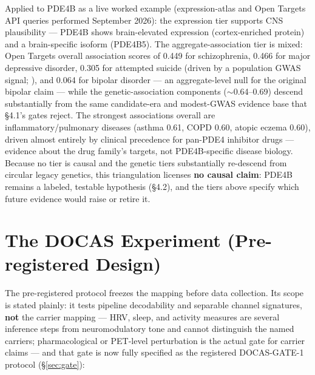 \documentclass[11pt,twocolumn]{article}
\theoremstyle{plain}
\begin{document}
Applied to PDE4B as a live worked example (expression-atlas and Open Targets API queries performed September 2026): the expression tier supports CNS plausibility --- PDE4B shows brain-elevated expression (cortex-enriched protein) and a brain-specific isoform (PDE4B5). The aggregate-association tier is mixed: Open Targets overall association scores of 0.449 for schizophrenia, 0.466 for major depressive disorder, 0.305 for attempted suicide (driven by a population GWAS signal; \citealp{erlangsen2020}), and 0.064 for bipolar disorder --- an aggregate-level null for the original bipolar claim --- while the genetic-association components ($\sim$0.64--0.69) descend substantially from the same candidate-era and modest-GWAS evidence base that \S{}4.1's gates reject. The strongest associations overall are inflammatory/pulmonary diseases (asthma 0.61, COPD 0.60, atopic eczema 0.60), driven almost entirely by clinical precedence for pan-PDE4 inhibitor drugs --- evidence about the drug family's targets, not PDE4B-specific disease biology. Because no tier is causal and the genetic tiers substantially re-descend from circular legacy genetics, this triangulation licenses \textbf{no causal claim}: PDE4B remains a labeled, testable hypothesis (\S{}4.2), and the tiers above specify which future evidence would raise or retire it.


\FloatBarrier
\section{The DOCAS Experiment (Pre-registered Design)}

The pre-registered protocol freezes the mapping before data collection. Its scope is stated plainly: it tests pipeline decodability and separable channel signatures, \textbf{not} the carrier mapping --- HRV, sleep, and activity measures are several inference steps from neuromodulatory tone and cannot distinguish the named carriers; pharmacological or PET-level perturbation is the actual gate for carrier claims --- and that gate is now fully specified as the registered DOCAS-GATE-1 protocol (\S\ref{sec:gate}):
\end{document}

